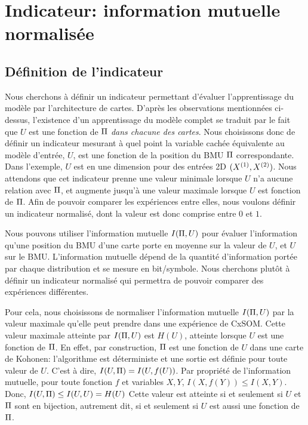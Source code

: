 \section{Indicateur: information mutuelle normalisée}

\subsection{Définition de l'indicateur}

Nous cherchons à définir un indicateur permettant d'évaluer l'apprentissage du modèle par l'architecture de cartes. D'après les observations mentionnées ci-dessus, l'existence d'un apprentissage du modèle complet se traduit par le fait que $U$ est une fonction de $\Pi$ \emph{dans chacune des cartes}.
Nous choisissons donc de définir un indicateur mesurant à quel point la variable cachée équivalente au modèle d'entrée, $U$, est une fonction de la position du BMU $\Pi$ correspondante.
Dans l'exemple, $U$ est en une dimension pour des entrées 2D $(X^{({1})},X^{({2})})$.
Nous attendons que cet indicateur prenne une valeur minimale lorsque $U$ n'a aucune relation avec $\Pi$, et augmente jusqu'à une valeur maximale lorsque $U$ est fonction de $\Pi$. Afin de pouvoir comparer les expériences entre elles, nous voulons définir un indicateur normalisé, dont la valeur est donc comprise entre $0$ et $1$.

Nous pouvons utiliser l'information mutuelle $I(\Pi, U)$ pour évaluer l'information qu'une position du BMU d'une carte porte en moyenne sur la valeur de $U$, et $U$ sur le BMU.
L'information mutuelle dépend de la quantité d'information portée par chaque distribution et se mesure en bit/symbole. Nous cherchons plutôt à définir un indicateur normalisé qui permettra de pouvoir comparer des expériences différentes.

Pour cela, nous choisissons de normaliser l'information mutuelle $I(\Pi,U)$  par la valeur maximale qu'elle peut prendre dans une expérience de CxSOM. Cette valeur maximale atteinte par $I(\Pi,U)$ est $H(U)$, atteinte lorsque $U$ est une fonction de $\Pi$.
En effet, par construction, $\Pi$ est une fonction de $U$ dans une carte de Kohonen: l'algorithme est déterministe et une sortie est définie pour toute valeur de $U$. C'est à dire, $I(U,\Pi) = I (U, f(U))$.
Par propriété de l'information mutuelle, pour toute fonction $f$ et variables $X,Y$, $I(X,f(Y)) \leq I(X,Y) $. 
Donc, $I(U,\Pi) \leq I(U,U) = H(U)$
Cette valeur est atteinte si et seulement si $U$ et $\Pi$ sont en bijection, autrement dit, si et seulement si $U$ est aussi une fonction de $\Pi$.

